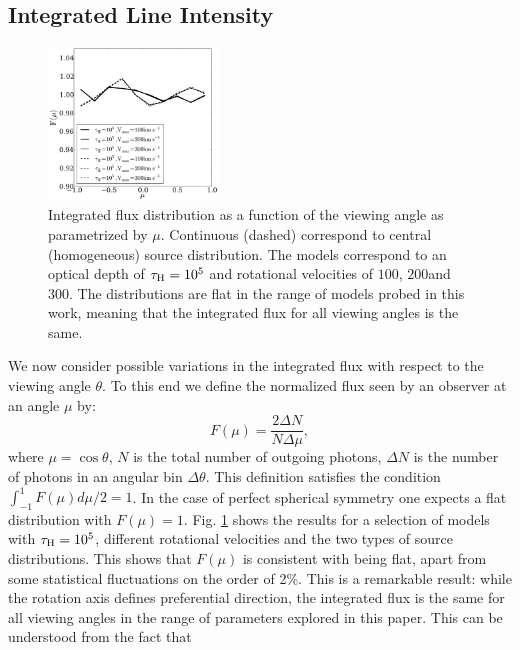\subsection{Integrated Line Intensity}
\label{sec:intlineint}
\begin{figure}
\begin{center}
\includegraphics[width=0.4\textwidth]{../Figures/f5.pdf}
\end{center}
\caption{Integrated flux distribution as a function of the
viewing angle as parametrized by $\mu$. Continuous (dashed)
correspond to central (homogeneous) source distribution.
The models correspond to an optical depth of $\tau_{\rm
H}=10^5$ and rotational velocities of $100$\kms, $200$\kms and
$300$\kms. The distributions are flat in the range of models probed
in this work, meaning that the integrated flux for all viewing
angles is the same.
\label{fig:muhisto}}
\end{figure}
We now consider possible variations in the integrated flux with
respect to the viewing angle $\theta$.
To this end we define the normalized flux seen by an observer at an
angle $\mu$ by:
\begin{equation}
F(\mu) = \frac{2\Delta N}{N\Delta \mu},
\end{equation}
%
where $\mu=\cos\theta$, $N$ is the total number of outgoing photons,
$\Delta N$ is the number of photons in an angular bin $\Delta
\theta$. This definition satisfies the condition
$\int_{-1}^{1}F(\mu)d\mu/2=1$. In the case of perfect spherical
symmetry one expects a flat distribution with $F(\mu)=1$.
Fig. \ref{fig:muhisto} shows the results for a selection of models
with $\tau_{\rm H}=10^{5}$, different rotational velocities and the two
types of source distributions. This shows that $F(\mu)$ is consistent with being flat, apart
from some statistical fluctuations on the order of 2\%.
This is a remarkable result: while the rotation axis defines preferential direction, the
integrated flux is the same for all viewing angles in the range of parameters explored in this paper. This can be understood from the fact that
